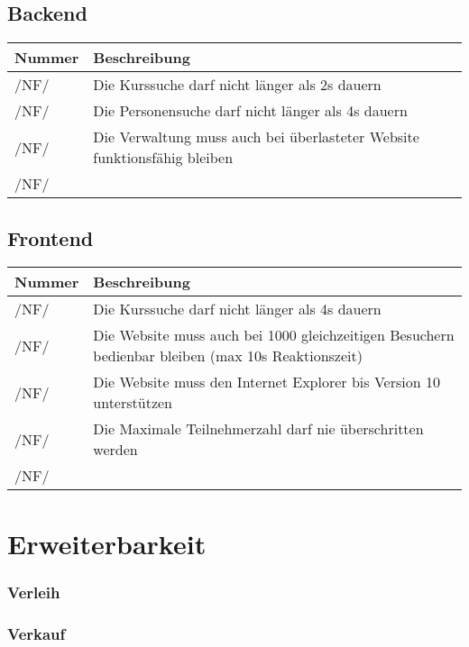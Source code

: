 \documentclass[a4paper,11pt]{article}
\newcommand\addrow[2]{#1 &#2\\ }
\newcommand\addheading[2]{#1 &#2\\ \hline}
\newcommand\tabularhead{\begin{tabular}{lp{13cm}}
\hline
}
\newenvironment{usecase}{\tabularhead}
{\hline\end{tabular}}
\begin{document}
\subsection{Backend}
\begin{usecase}
  \addheading{Nummer}{Beschreibung} 
  \addrow{/NF/}{Die Kurssuche darf nicht länger als 2s dauern}
  \addrow{/NF/}{Die Personensuche darf nicht länger als 4s dauern}
  \addrow{/NF/}{Die Verwaltung muss auch bei überlasteter Website funktionsfähig bleiben}
  \addrow{/NF/}{}
\end{usecase}

\subsection{Frontend}
\begin{usecase}
  \addheading{Nummer}{Beschreibung} 
  \addrow{/NF/}{Die Kurssuche darf nicht länger als 4s dauern}
  \addrow{/NF/}{Die Website muss auch bei 1000 gleichzeitigen Besuchern bedienbar bleiben (max 10s Reaktionszeit)}
  \addrow{/NF/}{Die Website muss den Internet Explorer bis Version 10 unterstützen}
  \addrow{/NF/}{Die Maximale Teilnehmerzahl darf nie überschritten werden}
  \addrow{/NF/}{}
\end{usecase}

\section{Erweiterbarkeit} \label{erweiterbarkeit}
\subsubsection{Verleih}
\subsubsection{Verkauf}
\end{document}
